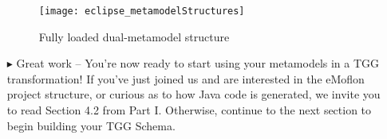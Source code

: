 \begin{itemize}
\begin{figure}[htbp]
\begin{center}
  \texttt{[image: eclipse\_metamodelStructures]}
  \caption{Fully loaded dual-metamodel structure}
  \label{fig:bothmetamodelstructures}
\end{center}
\end{figure}

\item[$\blacktriangleright$] Great work -- You're now ready to start using your metamodels in a TGG transformation! If you've just joined us and are interested
in the eMoflon project structure, or curious as to how Java code is generated, we invite you to read Section 4.2 from Part I. Otherwise, continue to the next section to begin
building your TGG Schema. 

\end{itemize}
